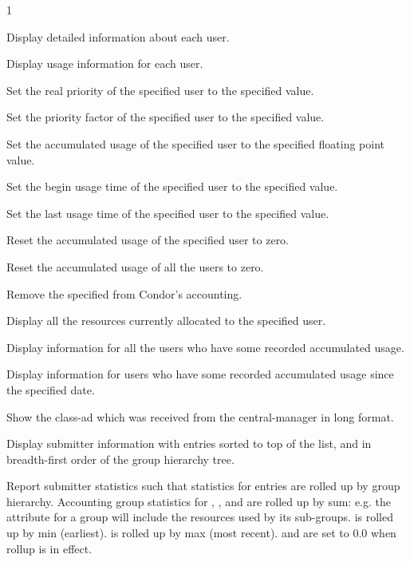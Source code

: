 \begin{ManPage}{\label{man-condor-userprio}}{1}
\begin{Options}
	{Display detailed information about each user.}

	{Display usage information for each user.}

	{Set the real priority of the specified user to the specified value.}

	{Set the priority factor of the specified user to the specified value.}

	{Set the accumulated usage of the specified user to the specified floating
     point value.}

	{Set the begin usage time of the specified user to the specified value.}

	{Set the last usage time of the specified user to the specified value.}

	{Reset the accumulated usage of the specified user to zero.}

	{Reset the accumulated usage of all the users to zero.}

	{Remove the specified  from Condor's accounting.}

	{Display all the resources currently allocated to the specified user.}

	{Display information for all the users who have some recorded accumulated usage.}

	{Display information for users who have some recorded accumulated usage since
the specified date.}

	{Show the class-ad which was received from the central-manager in long format.}

        {Display submitter information with  entries sorted 
to top of the list, and in breadth-first order of the group hierarchy tree.}

        {Report submitter statistics such that statistics for  
entries are rolled up by group hierarchy.  Accounting group statistics for 
, ,  
and  are rolled up by sum: e.g. the 
 attribute for a group will include the resources used by its 
sub-groups.   is rolled up by min (earliest). 
 is rolled up by max (most recent).  and 
 are set to 0.0 when rollup is in effect.}



\end{Options}
\end{ManPage}
